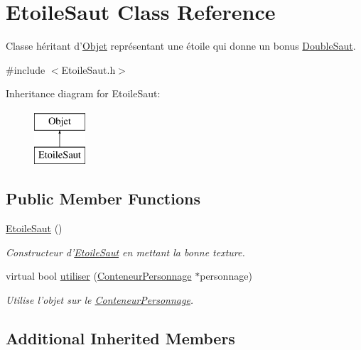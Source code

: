 \hypertarget{classEtoileSaut}{\section{Etoile\-Saut Class Reference}
\label{classEtoileSaut}
}


Classe héritant d'\hyperlink{classObjet}{Objet} représentant une étoile qui donne un bonus \hyperlink{classDoubleSaut}{Double\-Saut}.  




{\ttfamily \#include $<$Etoile\-Saut.\-h$>$}

Inheritance diagram for Etoile\-Saut\-:\begin{figure}[H]
\begin{center}
\leavevmode
\includegraphics[height=2.000000cm]{classEtoileSaut}
\end{center}
\end{figure}
\subsection*{Public Member Functions}
\begin{DoxyCompactItemize}
\item 
\hypertarget{classEtoileSaut_a1c294ea8a9690f6e9b4c599401bd1e27}{\hyperlink{classEtoileSaut_a1c294ea8a9690f6e9b4c599401bd1e27}{Etoile\-Saut} ()}\label{classEtoileSaut_a1c294ea8a9690f6e9b4c599401bd1e27}

\begin{DoxyCompactList}\small\item\em Constructeur d'\hyperlink{classEtoileSaut}{Etoile\-Saut} en mettant la bonne texture. \end{DoxyCompactList}\item 
virtual bool \hyperlink{classEtoileSaut_af30f742b2e192981573121e77f98272a}{utiliser} (\hyperlink{classConteneurPersonnage}{Conteneur\-Personnage} $\ast$personnage)
\begin{DoxyCompactList}\small\item\em Utilise l'objet sur le \hyperlink{classConteneurPersonnage}{Conteneur\-Personnage}. \end{DoxyCompactList}\end{DoxyCompactItemize}
\subsection*{Additional Inherited Members}


